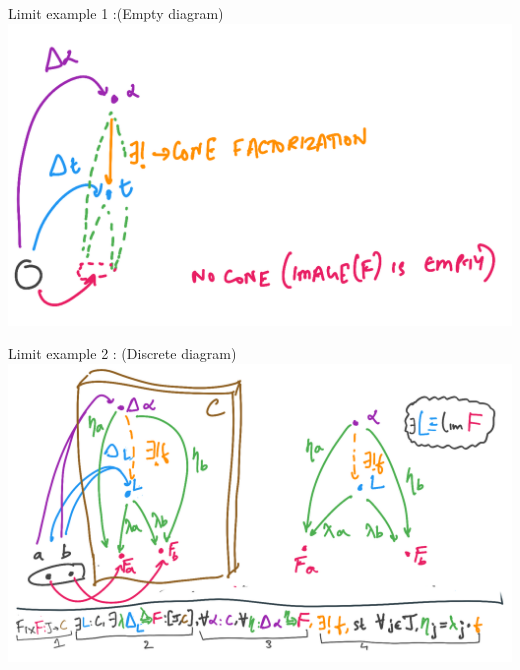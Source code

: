 \documentclass[8pt]{beamer}
\begin{document}
\begin{frame}{Limit example 1 :(Empty diagram)}
    \includegraphics[width=\textwidth]{./empty-diagram-limit.png}
\end{frame}

\begin{frame}{Limit example 2 : (Discrete diagram)}
    \includegraphics[width=\textwidth]{./discrete-diagram-limit.png}
\end{frame}
\end{document}
